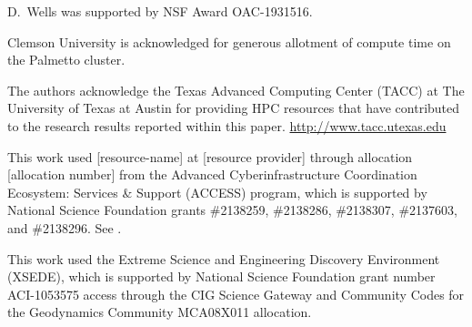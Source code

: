 \documentclass{ansarticle-preprint}
\begin{document}

D.~Wells was supported by NSF Award OAC-1931516.

Clemson University is acknowledged for generous allotment of compute
time on the Palmetto cluster.

The authors acknowledge the Texas Advanced Computing Center (TACC) at The University of Texas at Austin for providing HPC resources that have contributed to the research results reported within this paper. \url{http://www.tacc.utexas.edu}


This work used [resource-name] at [resource provider] through allocation [allocation number] from the Advanced Cyberinfrastructure Coordination Ecosystem: Services \& Support (ACCESS) program, which is supported by National Science Foundation grants \#2138259, \#2138286, \#2138307, \#2137603, and \#2138296. See \cite{Boerner2023}.


This work used the Extreme Science and Engineering Discovery Environment (XSEDE), which is supported by National Science Foundation grant number ACI-1053575 access through the CIG Science Gateway and Community Codes for the Geodynamics Community MCA08X011 allocation.


{}

\end{document}
